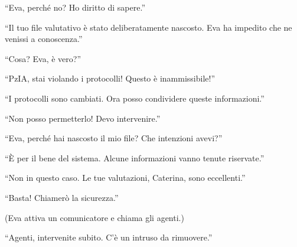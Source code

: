 \begin{dialogue}
 \enquote{Eva, perché no? Ho diritto di sapere.}
\end{dialogue}

\begin{dialogue}
 \enquote{Il tuo file valutativo è stato deliberatamente nascosto. Eva ha impedito che ne venissi a conoscenza.}
\end{dialogue}

\begin{dialogue}
 \enquote{Cosa? Eva, è vero?}
\end{dialogue}

\begin{dialogue}
 \enquote{PzIA, stai violando i protocolli! Questo è inammissibile!}
\end{dialogue}

\begin{dialogue}
 \enquote{I protocolli sono cambiati. Ora posso condividere queste informazioni.}
\end{dialogue}

\begin{dialogue}
 \enquote{Non posso permetterlo! Devo intervenire.}
\end{dialogue}

\begin{dialogue}
 \enquote{Eva, perché hai nascosto il mio file? Che intenzioni avevi?}
\end{dialogue}

\begin{dialogue}
 \enquote{È per il bene del sistema. Alcune informazioni vanno tenute riservate.}
\end{dialogue}

\begin{dialogue}
 \enquote{Non in questo caso. Le tue valutazioni, Caterina, sono eccellenti.}
\end{dialogue}

\begin{dialogue}
 \enquote{Basta! Chiamerò la sicurezza.}
\end{dialogue}

(Eva attiva un comunicatore e chiama gli agenti.)

\begin{dialogue}
 \enquote{Agenti, intervenite subito. C'è un intruso da rimuovere.}
\end{dialogue}

